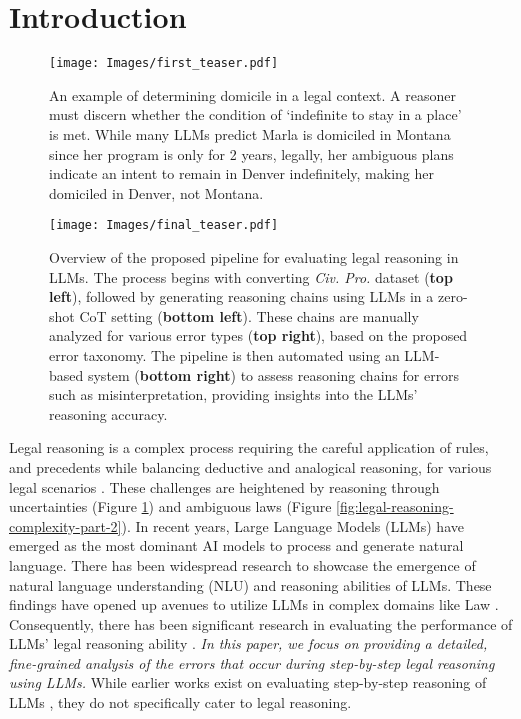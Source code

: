 \section{Introduction}
\begin{figure}[ht]
    \centering     \texttt{[image: Images/first\_teaser.pdf]}
    \caption{An example of determining domicile in a legal context. A reasoner must discern whether the condition of `indefinite to stay in a place' is met. While many LLMs predict Marla is domiciled in Montana since her program is only for 2 years, legally, her ambiguous plans indicate an intent to remain in Denver indefinitely, making her domiciled in Denver, not Montana.}
    \label{fig:first_teaser}
\end{figure}

\begin{figure*}[t]
    \centering     \texttt{[image: Images/final\_teaser.pdf]}
    \caption{Overview of the proposed pipeline for evaluating legal reasoning in LLMs. The process begins with converting \textit{Civ. Pro.} dataset (\textbf{top left}), followed by generating reasoning chains using LLMs in a zero-shot CoT setting (\textbf{bottom left}). These chains are manually analyzed for various error types (\textbf{top right}), based on the proposed error taxonomy. The pipeline is then automated using an LLM-based system (\textbf{bottom right}) to assess reasoning chains for errors such as misinterpretation, providing insights into the LLMs' reasoning accuracy.}
    \label{fig:teaser}
\end{figure*}

Legal reasoning is a complex process requiring the careful application of rules, and precedents 
while balancing deductive and analogical reasoning, for various legal scenarios \citep{walker2007discovering, hafner2002role}. 
These challenges are heightened by reasoning through uncertainties (Figure \ref{fig:first_teaser}) and ambiguous laws (Figure \ref{fig:legal-reasoning-complexity-part-2}).
In recent years, Large Language Models (LLMs) %
have emerged as the most dominant AI models to process and generate natural language. There has been widespread research to showcase the emergence of natural language understanding (NLU) and reasoning abilities \citep{zelikman2022star, zelikman2024quiet, hao2023reasoning, mondorf2024beyond, lanchantin2024learning} of LLMs. These findings have opened up avenues to utilize LLMs in complex domains like Law \citep{lai2023large}. Consequently, there has been significant research in evaluating the performance of LLMs' legal reasoning ability \citep{guha2023legalbench, blairstanek2023gpt3, kang2023can}. 
{\em In this paper, we focus on providing a detailed, fine-grained analysis of the errors that occur during step-by-step legal reasoning using LLMs.}
While earlier works exist on evaluating step-by-step reasoning of LLMs \citep{golovneva2023roscoesuitemetricsscoring,prasad2023recevalevaluatingreasoningchains}, they do not specifically cater to legal reasoning. 

